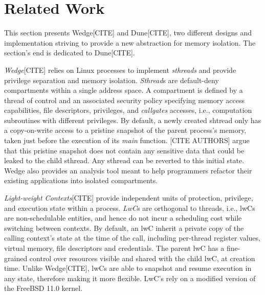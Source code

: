 \chapter{Related Work}
This section presents Wedge[CITE] and Dune[CITE], two different designs and implementation striving to provide a new abstraction for memory isolation.
The section's end is dedicated to Dune[CITE].

\textit{Wedge}[CITE] relies on Linux processes to implement \textit{sthreads} and provide 
privilege separation and memory isolation.
\textit{Sthread}s are default-deny compartments within a single address space.
A compartment is defined by a thread of control and an associated security policy specifying
memory access capabilities, file descriptors, privileges, and \textit{callgates} accesses, i.e., computation subroutines with different privileges.
By default, a newly created shtread only has a copy-on-write access to a pristine snapshot of the parent process's memory, taken just before the execution of its \textit{main} function.
[CITE AUTHORS] argue that this pristine snapshot does not contain any sensitive data that could be leaked
to the child sthread.
Any sthread can be reverted to this initial state.
Wedge also provides an analysis tool meant to help programmers refactor their existing applications into isolated compartments.

\textit{Light-weight Contexts}[CITE] provide independent units of protection, privilege, and execution state within a process.
\textit{LwC}s are orthogonal to threads, i.e., lwCs are non-schedulable entities, and hence do not incur a scheduling cost while switching between contexts.
By default, an lwC inherit a private copy of the calling context's state at the time of the call, including
per-thread register values, virtual memory, file descriptors and credentials.
The parent lwC has a fine-grained control over resources visible and shared with the child lwC, at creation time.
Unlike Wedge[CITE], lwCs are able to snapshot and resume execution in any state, therefore making it more flexible.
LwC's rely on a modified version of the FreeBSD 11.0 kernel.


